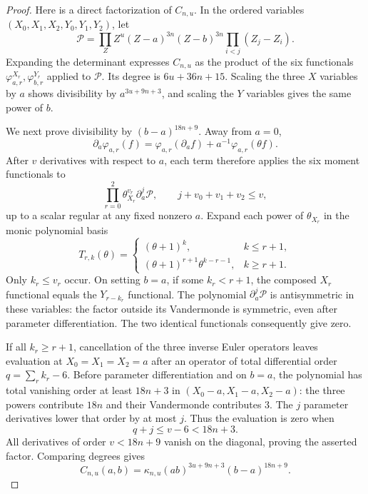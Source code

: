 \begin{proof}
Here is a direct factorization of $C_{n,u}$.  In the ordered variables
$(X_0,X_1,X_2,Y_0,Y_1,Y_2)$, let
\[
 \mathcal P=\prod_Z Z^u(Z-a)^{3n}(Z-b)^{3n}
               \prod_{i<j}(Z_j-Z_i).
\]
Expanding the determinant expresses $C_{n,u}$ as the product of the
six functionals $\varphi_{a,r}^{X_r},\varphi_{b,r}^{Y_r}$ applied
to $\mathcal P$.  Its degree is $6u+36n+15$.
Scaling the three $X$ variables by $a$ shows divisibility by
$a^{3u+9n+3}$, and scaling the $Y$ variables gives the same power
of $b$.

We next prove divisibility by $(b-a)^{18n+9}$.  Away from $a=0$,
\[
 \partial_a\varphi_{a,r}(f)
 =\varphi_{a,r}(\partial_af)
    +a^{-1}\varphi_{a,r}(\theta f).
\]
After $v$ derivatives with respect to $a$, each term therefore applies
the six moment functionals to
\[
 \prod_{r=0}^2\theta_{X_r}^{v_r}\partial_a^j\mathcal P,
 \qquad j+v_0+v_1+v_2\le v,
\]
up to a scalar regular at any fixed nonzero $a$.  Expand each power
of $\theta_{X_r}$ in the monic polynomial basis
\[
 T_{r,k}(\theta)=
 \begin{cases}
  (\theta+1)^k,&k\le r+1,\\
  (\theta+1)^{r+1}\theta^{k-r-1},&k\ge r+1.
 \end{cases}
\]
Only $k_r\le v_r$ occur.  On setting $b=a$, if some
$k_r<r+1$, the composed $X_r$ functional equals the
$Y_{r-k_r}$ functional.  The polynomial $\partial_a^j\mathcal P$
is antisymmetric in these variables: the factor outside its
Vandermonde is symmetric, even after parameter differentiation.
The two identical functionals consequently give zero.

If all $k_r\ge r+1$, cancellation of the three inverse Euler
operators leaves evaluation at $X_0=X_1=X_2=a$ after an operator
of total differential order $q=\sum_r k_r-6$.
Before parameter differentiation and on $b=a$, the polynomial
has total vanishing order at least $18n+3$ in
$(X_0-a,X_1-a,X_2-a)$: the three powers contribute $18n$ and
their Vandermonde contributes $3$.  The $j$ parameter derivatives
lower that order by at most $j$.  Thus the evaluation is zero when
\[
 q+j\le v-6<18n+3.
\]
All derivatives of order $v<18n+9$ vanish on the diagonal, proving
the asserted factor.  Comparing degrees gives
\begin{equation}\label{eq:C-pade-coalescence}
 C_{n,u}(a,b)=\kappa_{n,u}
       (ab)^{3u+9n+3}(b-a)^{18n+9}.
\end{equation}


\end{proof}
